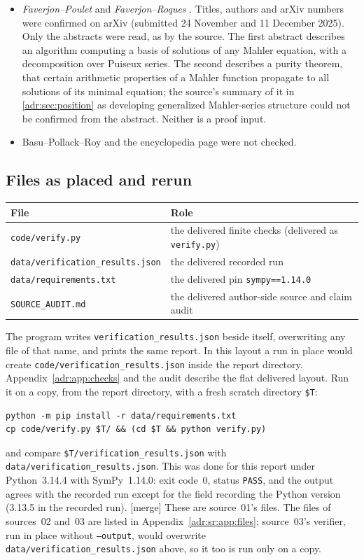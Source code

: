 \documentclass[11pt,letterpaper]{article}
\numberwithin{equation}{section}
\theoremstyle{definition}
\theoremstyle{remark}
\newcommand{\rpath}[1]{\nolinkurl{#1}}%
\newcommand{\mtag}{\textup{[merge]}}%
\begin{document}
\begin{itemize}[leftmargin=*,itemsep=3pt]
is unverified here.
\item \emph{Faverjon--Poulet} \cite{FP} and \emph{Faverjon--Roques}
\cite{FRPurity}. Titles, authors and arXiv numbers were confirmed on arXiv
(submitted 24 November and 11 December 2025). Only the abstracts were read,
as by the source. The first abstract describes an algorithm computing a
basis of solutions of any Mahler equation, with a decomposition over
Puiseux series. The second describes a purity theorem, that certain
arithmetic properties of a Mahler function propagate to all solutions of
its minimal equation; the source's summary of it in
\cref{adr:sec:position} as developing generalized Mahler-series structure
could not be confirmed from the abstract. Neither is a proof input.
\item Basu--Pollack--Roy \cite{BPR} and the encyclopedia page \cite{Wiki}
were not checked.
\end{itemize}

\subsection{Files as placed and rerun}\label{adr:app:files}

\begin{center}\small
\begin{tabular}{@{}ll@{}}
\toprule
File & Role \\
\midrule
\rpath{code/verify.py} & the delivered finite checks (delivered as \texttt{verify.py})\\
\rpath{data/verification_results.json} & the delivered recorded run\\
\rpath{data/requirements.txt} & the delivered pin \texttt{sympy==1.14.0}\\
\rpath{SOURCE_AUDIT.md} & the delivered author-side source and claim audit\\
\bottomrule
\end{tabular}
\end{center}

The program writes \texttt{verification\_results.json} beside itself,
overwriting any file of that name, and prints the same report. In this
layout a run in place would create \rpath{code/verification_results.json}
inside the report directory. Appendix~\ref{adr:app:checks} and the audit describe
the flat delivered layout. Run it on a copy, from the report directory,
with a fresh scratch directory \texttt{\$T}:
\begin{verbatim}
python -m pip install -r data/requirements.txt
cp code/verify.py $T/ && (cd $T && python verify.py)
\end{verbatim}
and compare \texttt{\$T/verification\_results.json} with
\rpath{data/verification_results.json}. This was done for this report
under Python~3.14.4 with SymPy~1.14.0: exit code~0, status \texttt{PASS},
and the output agrees with the recorded run except for the field recording
the Python version (3.13.5 in the recorded run).
\mtag{} These are source~01's files. The files of sources~02 and~03 are listed
in Appendix~\ref{adr:sr:app:files}; source~03's verifier, run in place
without \texttt{--output}, would overwrite \rpath{data/verification_results.json}
above, so it too is run only on a copy.
\end{document}
